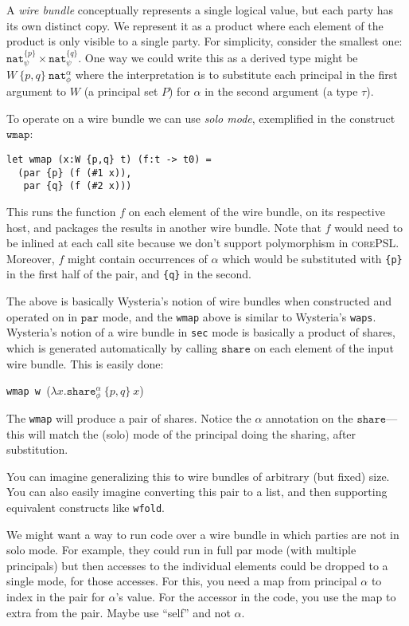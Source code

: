 \documentclass[10pt]{article}
\newcommand{\kw}[1]{\ensuremath{\mathtt{#1}}}
\newcommand{\tnat}{\ensuremath{\mathtt{nat}}}
\newcommand{\tpair}[2]{\ensuremath{{#1} \times {#2}}}
\newcommand{\eshare}[4]{\ensuremath{\kw{share}^{#2}_{#1}~{#3}~{#4}}}
\newcommand{\elam}[2]{\ensuremath{\lambda {#1}.{#2}}}
\newcommand{\lang}{\textsc{corePSL}\xspace}
\begin{document}
A \emph{wire bundle} conceptually represents a single logical value,
but each party has its own distinct copy. We represent it as a product
where each element of the product is only visible to a single
party. For simplicity, consider the smallest one:
$\tpair{\tnat^{\{p\}}_\psi}{\tnat^{\{q\}}_\psi}$. One way we could
write this as a derived type might be $W~\{p,q\}~\tnat^\alpha_\phi$
where the interpretation is to substitute each principal in the first
argument to $W$ (a principal set $P$) for $\alpha$ in the second
argument (a type $\tau$).

To operate on a wire bundle we can use \emph{solo mode}, exemplified
in the construct $\kw{wmap}$:
\begin{verbatim}
let wmap (x:W {p,q} t) (f:t -> t0) =
  (par {p} (f (#1 x)), 
   par {q} (f (#2 x)))
\end{verbatim}
This runs the function $f$ on each element of the wire bundle, on its
respective host, and packages the results in another wire bundle. Note
that $f$ would need to be inlined at each call site because we don't
support polymorphism in \lang. Moreover, $f$ might contain
occurrences of $\alpha$ which would  be substituted with
\texttt{\{p\}} in the first half of the pair, and \texttt{\{q\}} in
the second.

The above is basically Wysteria's notion of wire bundles when
constructed and operated on in $\kw{par}$ mode, and the \texttt{wmap}
above is similar to Wysteria's \texttt{waps}. Wysteria's notion of a
wire bundle in \texttt{sec} mode is basically a product of
shares, which is generated automatically by calling $\kw{share}$ on
each element of the input wire bundle. This is easily done:

\bigskip
\noindent
\texttt{wmap w }($\elam{x}{\eshare{\phi}{\alpha}{\{p,q\}}{x}}$)
\bigskip

\noindent
The \texttt{wmap} will produce a pair of shares. Notice the
$\alpha$ annotation on the $\kw{share}$---this will match the (solo)
mode of the principal doing the sharing, after substitution.

You can imagine generalizing this to wire bundles of arbitrary (but
fixed) size. You can also easily imagine converting this pair to a
list, and then supporting equivalent constructs like \texttt{wfold}.

We might want a way to run code over a wire bundle in which parties
are not in solo mode. For example, they could run in full par mode
(with multiple principals) but then accesses to the individual elements
could be dropped to a single mode, for those accesses. For this, you
need a map from principal $\alpha$ to index in the pair for $\alpha$'s
value. For the accessor in the code, you use the map to extra from the
pair. Maybe use ``self'' and not $\alpha$.
\end{document}

